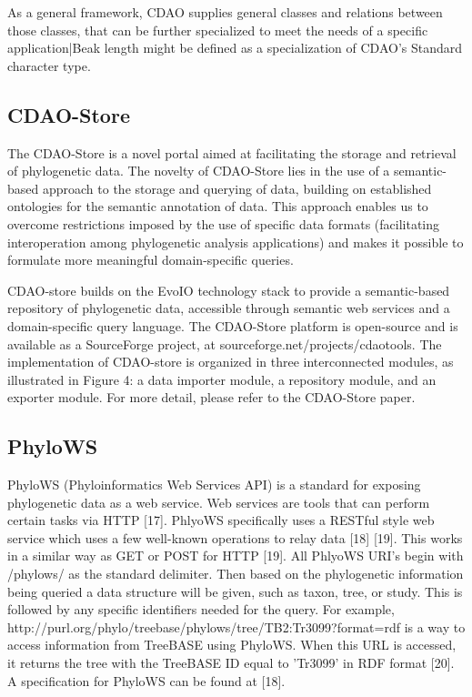 \documentclass[10pt]{article}
\begin{document}
As a general framework, CDAO supplies general classes and relations between those classes, that can be further specialized to meet the needs of a specific application|Beak length might be defined as a specialization of CDAO's Standard character type.

\subsection{CDAO-Store}
The CDAO-Store is a novel portal aimed at facilitating the storage and retrieval of phylogenetic data. The novelty of CDAO-Store lies in the use of a semantic-based approach to the storage and querying of data, building on established ontologies for the semantic annotation of data. This approach enables us to overcome restrictions imposed by the use of specific data formats (facilitating interoperation among phylogenetic analysis applications) and makes it possible to formulate more meaningful domain-specific queries.

CDAO-store builds on the EvoIO technology stack to provide a semantic-based repository of phylogenetic data, accessible through semantic web services and a domain-specific query language. The CDAO-Store platform is open-source and is available as a SourceForge project, at sourceforge.net/projects/cdaotools.  The implementation of CDAO-store is organized in three interconnected modules, as illustrated in Figure 4: a data importer module, a repository module, and an exporter module.  For more detail, please refer to the CDAO-Store paper.

\subsection{PhyloWS}
PhyloWS (Phyloinformatics Web Services API) is a standard for exposing phylogenetic data as a web service. Web services are tools that can perform certain tasks via HTTP [17]. PhlyoWS specifically uses a RESTful style web service which uses a few well-known operations to relay data [18] [19]. This works in a similar way as GET or POST for HTTP [19].  All PhlyoWS URI's begin with /phylows/ as the standard delimiter. Then based on the phylogenetic information being queried a data structure will be given, such as taxon, tree, or study.  This is followed by any specific identifiers needed for the query. For example, http://purl.org/phylo/treebase/phylows/tree/TB2:Tr3099?format=rdf is a way to access information from TreeBASE using PhyloWS. When this URL is accessed, it returns the tree with the TreeBASE ID equal to 'Tr3099' in RDF format [20]. A specification for PhyloWS can be found at [18].
\end{document}
